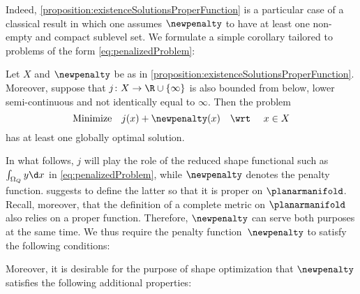 Indeed, \cref{proposition:existenceSolutionsProperFunction} is a particular case of a classical result in which one assumes $\newpenalty$ to have at least one non-empty and compact sublevel set.
We formulate a simple corollary tailored to problems of the form \eqref{eq:penalizedProblem}:
\begin{corollary}
	\label{corollary:existenceSolutionpenalizedprob}
	Let $X$ and $\newpenalty$ be as in \cref{proposition:existenceSolutionsProperFunction}.
	Moreover, suppose that $j \colon X \to \R \cup \{\infty\}$ is also bounded from below, lower semi-continuous and not identically equal to $\infty$.
	Then the problem
	\begin{equation}
		\label{eq:minimizationProperFunctionAndRedFunction}
		\text{Minimize}
		\quad
		j(x) + \newpenalty(x)
		\quad
		\text{\wrt }
		\quad
		x \in X
	\end{equation}
	has at least one globally optimal solution.
\end{corollary}

In what follows, $j$ will play the role of the reduced shape functional such as $\int_{\Omega_Q} y \d x$ in \eqref{eq:penalizedProblem}, while $\newpenalty$ denotes the penalty function.
 suggests to define the latter so that it is proper on $\planarmanifold$.
Recall, moreover, that the definition of a complete metric on $\planarmanifold$ also relies on a proper function.
Therefore, $\newpenalty$ can serve both purposes at the same time.
We thus require the penalty function~$\newpenalty$ to satisfy the following conditions:
Moreover, it is desirable for the purpose of shape optimization that $\newpenalty$ satisfies the following additional properties:

